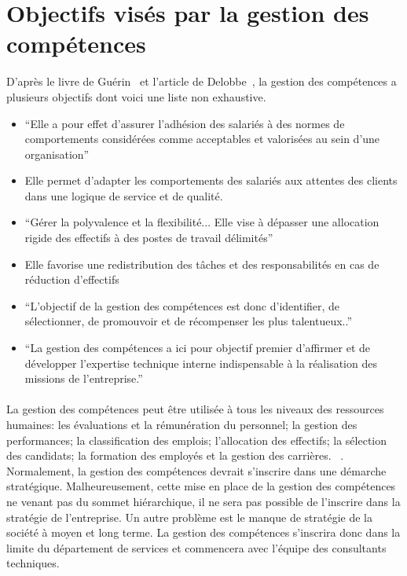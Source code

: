 \section{Objectifs visés par la gestion des compétences}
D'après le livre de Guérin~\citep{gestionressourceshumaine2007} et l'article de Delobbe~\citep{delobbe}, la gestion des compétences a plusieurs objectifs dont voici une liste non exhaustive.
\begin{itemize}
    \item \enquote{Elle a pour effet d'assurer l'adhésion des salariés à des normes de comportements considérées comme acceptables et valorisées au sein d'une organisation}~\citep[p.40]{delobbe}
    \item Elle permet d'adapter les comportements des salariés aux attentes des clients dans une logique de service et de qualité. ~\citep[182]{gestionressourceshumaine2007}
    \item \enquote{Gérer la polyvalence et la flexibilité... Elle vise à dépasser une allocation rigide des effectifs à des postes de travail délimités}~\citep[p.41]{delobbe}
    \item Elle favorise une redistribution des tâches et des responsabilités en cas de réduction d'effectifs ~\citep[182]{gestionressourceshumaine2007}
    \item  \enquote{L'objectif de la gestion des compétences est donc d'identifier, de sélectionner, de promouvoir et de récompenser les plus talentueux..}~\citep[p.43]{delobbe}
    \item  \enquote{La gestion des compétences a ici pour objectif premier d'affirmer et de développer l'expertise technique interne indispensable à la réalisation des missions de l'entreprise.} ~\citep[p.45]{delobbe}

\end{itemize}

\paragraph{}La gestion des compétences peut être utilisée à tous les niveaux des ressources humaines: les évaluations et la rémunération du personnel; la gestion des performances; la classification des emplois; l'allocation des effectifs; la sélection des candidats; la formation des employés et la gestion des carrières. ~\citep[p.32]{delobbe}. Normalement, la gestion des compétences devrait s'inscrire dans une démarche stratégique. Malheureusement, cette mise en place de la gestion des compétences ne venant pas du sommet hiérarchique, il ne sera pas possible de l'inscrire dans la stratégie de l'entreprise. Un autre problème est le manque de stratégie de la société à moyen et long terme.  La gestion des compétences s'inscrira donc dans la limite du département de services et commencera avec l'équipe des consultants techniques. 

